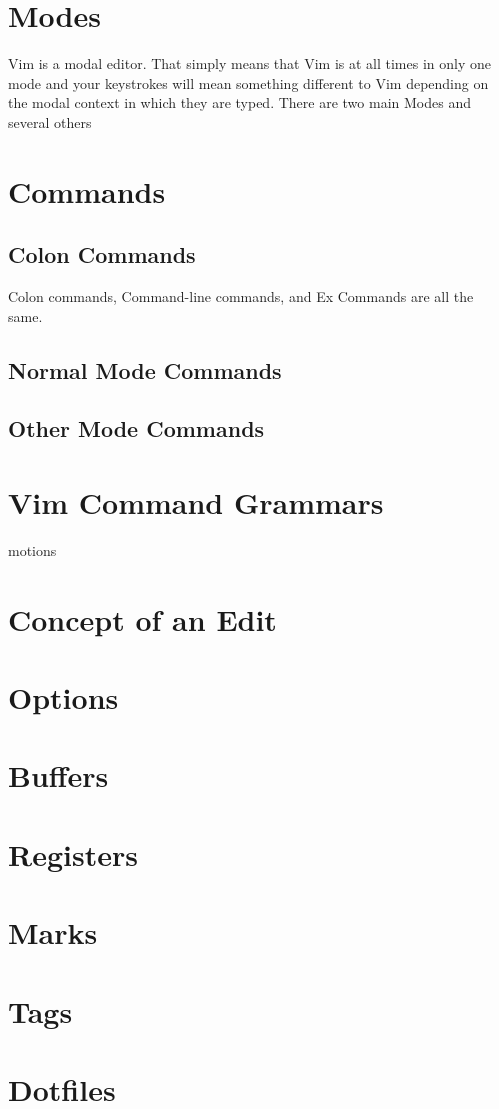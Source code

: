 \documentclass[12pt, oneside]{book}
\begin{document}
\section{Modes}
Vim is a modal editor.  That simply means that Vim is at all times in only one mode and your keystrokes will mean something different to Vim depending on the modal context in which they are typed.  There
are two main Modes and several others
\section{Commands}
  \subsection{Colon Commands}
  Colon commands, Command-line commands, and Ex Commands are all the same.
  \subsection{Normal Mode Commands}
  \subsection{Other Mode Commands}
\section{Vim Command Grammars}
motions
\section{Concept of an Edit}
\section{Options}
\section{Buffers}
\section{Registers}
\section{Marks}
\section{Tags}
\section{Dotfiles}
\end{document}

